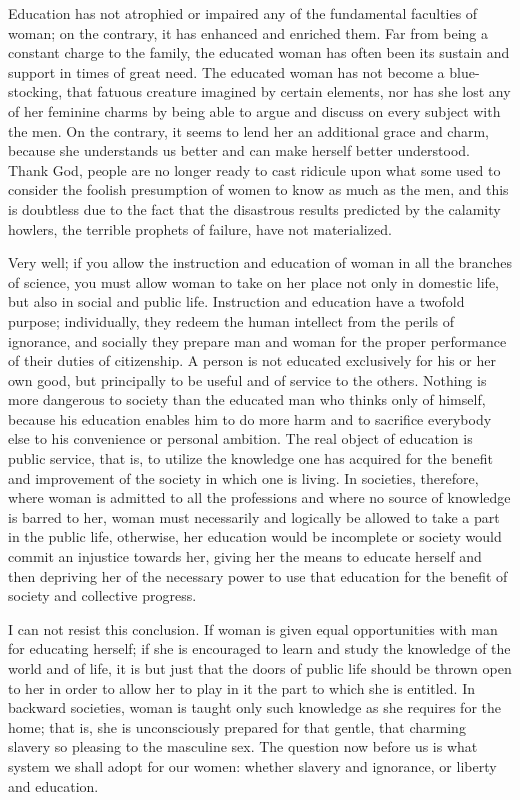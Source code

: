 \begin{linenumbers}
\indent Education has not atrophied or impaired any of the fundamental faculties of woman; on the contrary, it has enhanced and enriched them. Far from being a constant charge to the family, the educated woman has often been its sustain and support in times of great need. The educated woman has not become a blue-stocking, that fatuous creature imagined by certain elements, nor has she lost any of her feminine charms by being able to argue and discuss on every subject with the men. On the contrary, it seems to lend her an additional grace and charm, because she understands us better and can make herself better understood. Thank God, people are no longer ready to cast ridicule upon what some used to consider the foolish presumption of women to know as much as the men, and this is doubtless due to the fact that the disastrous results predicted by the calamity howlers, the terrible prophets of failure, have not materialized.

\indent Very well; if you allow the instruction and education of woman in all the branches of science, you must allow woman to take on her place not only in domestic life, but also in social and public life. Instruction and education have a twofold purpose; individually, they redeem the human intellect from the perils of ignorance, and socially they prepare man and woman for the proper performance of their duties of citizenship. A person is not educated exclusively for his or her own good, but principally to be useful and of service to the others. Nothing is more dangerous to society than the educated man who thinks only of himself, because his education enables him to do more harm and to sacrifice everybody else to his convenience or personal ambition. The real object of education is public service, that is, to utilize the knowledge one has acquired for the benefit and improvement of the society in which one is living.
In societies, therefore, where woman is admitted to all the professions and where no source of knowledge is barred to her, woman must necessarily and logically be allowed to take a part in the public life, otherwise, her education would be incomplete or society would commit an injustice towards her, giving her the means to educate herself and then depriving her of the necessary power to use that education for the benefit of society and collective progress.

\indent I can not resist this conclusion. If woman is given equal opportunities with man for educating herself; if she is encouraged to learn and study the knowledge of the world and of life, it is but just that the doors of public life should be thrown open to her in order to allow her to play in it the part to which she is entitled. In backward societies, woman is taught only such knowledge as she requires for the home; that is, she is unconsciously prepared for that gentle, that charming slavery so pleasing to the masculine sex. The question now before us is what system we shall adopt for our women: whether slavery and ignorance, or liberty and education.


\end{linenumbers}

